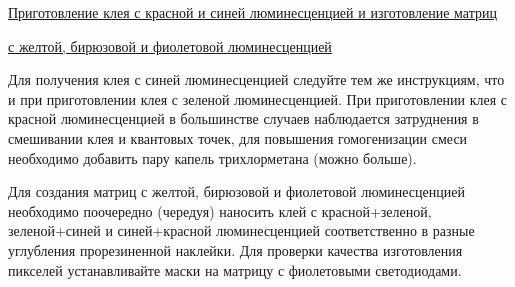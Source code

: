 \underline{Приготовление клея с красной и синей люминесценцией и изготовление матриц}

\underline{с желтой, бирюзовой и фиолетовой люминесценцией}

Для получения клея с синей люминесценцией следуйте тем же инструкциям, что и при приготовлении клея с зеленой люминесценцией. При приготовлении клея с красной люминесценцией в большинстве случаев наблюдается затруднения в смешивании клея и квантовых точек, для повышения гомогенизации смеси необходимо добавить пару капель трихлорметана (можно больше).

Для создания матриц с желтой, бирюзовой и фиолетовой люминесценцией необходимо поочередно (чередуя) наносить клей с красной+зеленой, зеленой+синей и синей+красной люминесценцией соответственно в разные углубления прорезиненной наклейки. Для проверки качества изготовления пикселей устанавливайте маски на матрицу с фиолетовыми светодиодами.